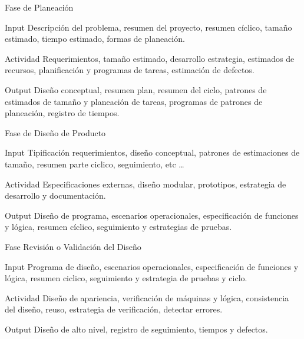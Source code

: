 \documentclass[]{beamer}
\begin{document}
			\begin{frame}{Fase de Planeación}
				\begin{block}{Input}
					Descripción del problema, resumen del proyecto, resumen cíclico, tamaño estimado, tiempo estimado, formas de planeación.
				\end{block}
				\begin{block}{Actividad}
					Requerimientos, tamaño estimado, desarrollo estrategia, estimados de recursos, planificación y programas de tareas, estimación de defectos.
				\end{block}
				\begin{block}{Output}
					Diseño conceptual, resumen plan, resumen del ciclo, patrones de estimados de tamaño y planeación de tareas, programas de patrones de planeación, registro de tiempos.
				\end{block}
			\end{frame}
			
			\begin{frame}{Fase de Diseño de Producto}
				\begin{block}{Input}
					Tipificación requerimientos, diseño conceptual, patrones de estimaciones de tamaño, resumen parte ciclico, seguimiento, etc \ldots
				\end{block}
				\begin{block}{Actividad}
					Especificaciones externas, diseño modular, prototipos, estrategia de desarrollo y documentación.
				\end{block}
				\begin{block}{Output}
					Diseño de programa, escenarios operacionales, especificación de funciones y lógica, resumen cíclico, seguimiento y estrategias de pruebas.

				\end{block}
			\end{frame}

			\begin{frame}{Fase Revisión o Validación del Diseño}
				\begin{block}{Input}
					Programa de diseño, escenarios operacionales, especificación de funciones y lógica, resumen ciclico, seguimiento y estrategia de pruebas y ciclo.
				\end{block}
				\begin{block}{Actividad}
					Diseño de apariencia, verificación de máquinas y lógica, consistencia del diseño, reuso, estrategia de verificación, detectar errores.
				\end{block}
				\begin{block}{Output}
					Diseño de alto nivel, registro de seguimiento, tiempos y defectos.
				\end{block}
			\end{frame}
			
\end{document}
